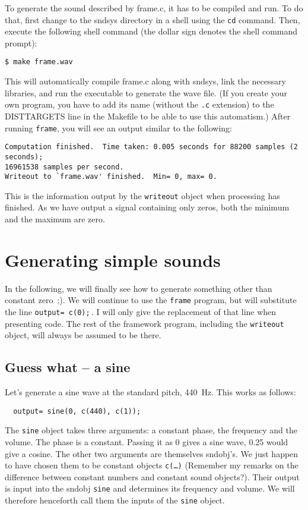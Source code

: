 \documentclass{article}
\def\s{{\sc sndsys} }
\def\sn{{\sc sndsys}}
\def\bv{\begin{verbatim}}
\begin{document}
To generate the sound described by frame.c, it has to be compiled and run.  To
do that, first change to the \s directory in a shell using the {\tt cd}
command.  Then, execute the following shell command  (the dollar sign denotes
the shell command prompt):

\bv
$ make frame.wav
\end{verbatim}

This will automatically compile frame.c along with \sn, link the necessary
libraries, and run the executable to generate the wave file.  (If you create
your own program, you have to add its name (without the {\tt .c} extension)
to the DISTTARGETS line in the Makefile to be able to use this automatism.)
After running {\tt frame}, you will see an output similar to the following:

\bv
Computation finished.  Time taken: 0.005 seconds for 88200 samples (2 seconds);
16961538 samples per second.
Writeout to `frame.wav' finished.  Min= 0, max= 0.
\end{verbatim}

This is the information output by the {\tt writeout} object when processing has
finished.  As we have output a signal containing only zeros, both the minimum
and the maximum are zero.


\section{Generating simple sounds}

In the following, we will finally see how to generate something other than 
constant zero~;).  We will continue to use the {\tt frame} program, but will
substitute the line {\tt output= c(0);}\,.  I will only give the replacement of
that line when presenting code.  The rest of the framework program, including
the {\tt writeout} object, will always be assumed to be there.

\subsection{Guess what -- a sine}

Let's generate a sine wave at the standard pitch, 440~Hz.  This works as
follows:

\bv
  output= sine(0, c(440), c(1));
\end{verbatim}

The {\tt sine} object takes three arguments:  a constant phase, the frequency
and the volume.  The phase is a constant.  Passing it as 0 gives a sine wave,
0.25 would give a cosine.  The other two arguments are themselves sndobj's.
We just happen to have chosen them to be constant objects {\tt c(\ldots)}
(Remember my remarks on the difference between constant numbers and constant
sound objects?).  Their output is input into the sndobj {\tt sine} and
determines its frequency and volume.  We will therefore henceforth call them
the inputs of the {\tt sine} object.
\end{document}
